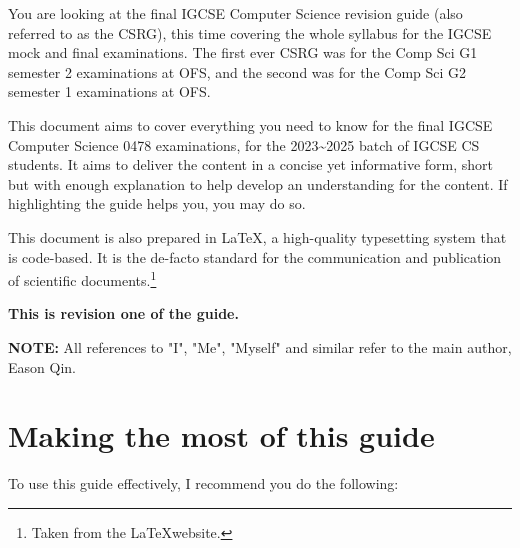 \documentclass[../main.tex]{subfiles}
\begin{document}
You are looking at the final IGCSE Computer Science revision guide (also referred to as the CSRG), this time covering the whole syllabus for the IGCSE mock and final examinations. The first ever CSRG was for the Comp Sci G1 semester 2 examinations at OFS, and the second was for the Comp Sci G2 semester 1 examinations at OFS.

This document aims to cover everything you need to know for the final IGCSE Computer Science 0478 examinations, for the 2023\textasciitilde2025 batch of IGCSE CS students. It aims to deliver the content in a concise yet informative form, short but with enough explanation to help develop an understanding for the content. If highlighting the guide helps you, you may do so.

This document is also prepared in \LaTeX, a high-quality typesetting system that is code-based. It is the de-facto standard for the communication and publication of scientific documents.\footnote{Taken from the \LaTeX  website.}

\textbf{This is revision one of the guide.}

\textbf{NOTE:} All references to "I", "Me", "Myself" and similar refer to the main author, Eason Qin.

\section*{Making the most of this guide}

To use this guide effectively, I recommend you do the following:
\end{document}

